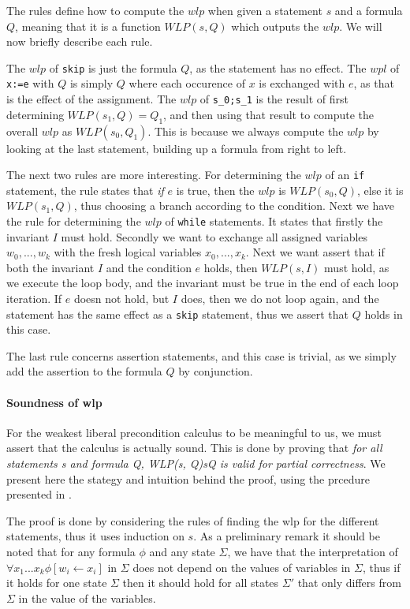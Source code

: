 The rules define how to compute the $wlp$ when given a statement $s$ and a formula $Q$, meaning that it is a function $WLP(s,Q)$ which outputs the $wlp$.
We will now briefly describe each rule.

The $wlp$ of \texttt{skip} is just the formula $Q$, as the statement has no effect.
The $wpl$ of \texttt{x:=e} with $Q$ is simply $Q$ where each occurence of $x$ is exchanged with $e$, as that is the effect of the assignment.
The $wlp$ of \texttt{s_0;s_1} is the result of first determining $WLP(s_{1},Q) = Q_{1}$, and then using that result to compute the overall $wlp$ as $WLP(s_{0}, Q_{1})$. This is because we always compute the $wlp$ by looking at the last statement, building up a formula from right to left.

The next two rules are more interesting.
For determining the $wlp$ of an \texttt{if} statement, the rule states that \textit{if} $e$ is true, then the $wlp$ is $WLP(s_{0}, Q)$, else it is $WLP(s_{1},Q)$, thus choosing a branch according to the condition.
Next we have the rule for determining the $wlp$ of \texttt{while} statements.
It states that firstly the invariant $I$ must hold. Secondly we want to exchange all assigned variables $w_{0},...,w_{k}$ with the fresh logical variables $x_{0},...,x_{k}$. Next we want assert that if both the invariant $I$ and the condition $e$ holds, then $WLP(s, I)$ must hold, as we execute the loop body, and the invariant must be true in the end of each loop iteration. If $e$ doesn not hold, but $I$ does, then we do not loop again, and the statement has the same effect as a \texttt{skip} statement, thus we assert that $Q$ holds in this case.

The last rule concerns assertion statements, and this case is trivial, as we simply add the assertion to the formula $Q$ by conjunction.

\paragraph{Soundness of wlp}
For the weakest liberal precondition calculus to be meaningful to us, we must assert that the calculus is actually sound.
This is done by proving that \textit{for all statements s and formula Q, {WLP(s, Q)}s{Q} is valid for partial correctness}.
We present here the stategy and intuition behind the proof, using the prcedure presented in \cite{wlp}.

The proof is done by considering the rules of finding the wlp for the different statements, thus it uses induction on $s$.
As a preliminary remark it should be noted that for any formula $\phi$ and any state $\Sigma$, we have that the interpretation of $\forall x_{1} ... x_{k} \phi [w_{i} \leftarrow x_{i}]$ in $\Sigma$ does not depend on the values of variables in $\Sigma$, thus if it holds for one state $\Sigma$ then it should hold for all states $\Sigma'$ that only differs from $\Sigma$ in the value of the variables.

